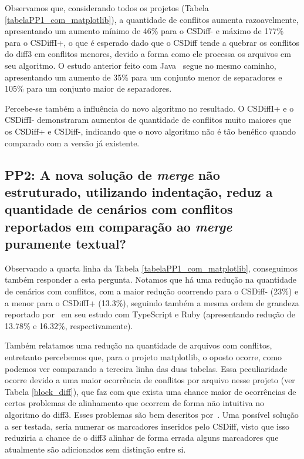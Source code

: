 Observamos que, considerando todos os projetos (Tabela \ref{tabelaPP1_com_matplotlib}), a quantidade de conflitos aumenta
razoavelmente, apresentando um aumento mínimo de 46\% para o CSDiff- e máximo de 177\% para o CSDiffI+, o que é esperado dado que o
CSDiff tende a quebrar os conflitos do diff3 em conflitos menores, devido a forma como ele processa os arquivos em seu algoritmo.
O estudo anterior feito com Java~\cite{clem21} segue no mesmo caminho, apresentando um aumento de 35\% para um conjunto menor de
separadores e 105\% para um conjunto maior de separadores.

Percebe-se também a influência do novo algoritmo no resultado. O CSDiffI+ e o CSDiffI- demonstraram aumentos de quantidade de
conflitos muito maiores que os CSDiff+ e CSDiff-, indicando que o novo algoritmo não é tão benéfico quando comparado com a
versão já existente.

\subsection{PP2: A nova solução de \emph{merge} não estruturado, utilizando indentação,
	reduz a quantidade de cenários com conflitos reportados em comparação ao \emph{merge} puramente textual?}
Observando a quarta linha da Tabela \ref{tabelaPP1_com_matplotlib}, conseguimos também responder a esta pergunta. Notamos
que há uma redução na quantidade de cenários com conflitos, com a maior redução ocorrendo para o CSDiff- (23\%) e a menor para o
CSDiffI+ (13.3\%), seguindo também a mesma ordem de grandeza reportado por~\citeauthor{heitor21} em seu estudo com TypeScript
e Ruby (apresentando redução de 13.78\% e 16.32\%, respectivamente).

Também relatamos uma redução na quantidade de arquivos com conflitos, entretanto percebemos que,
para o projeto matplotlib, o oposto ocorre, como podemos ver comparando a terceira linha das duas tabelas. Essa peculiaridade
ocorre devido a uma maior ocorrência de conflitos por arquivo nesse projeto (ver Tabela \ref{block_diff}), que faz com que
exista uma chance maior de ocorrências de certos problemas de alinhamento que ocorrem de forma não intuitiva no algoritmo do
diff3. Esses problemas são bem descritos por~\cite{khan07}. Uma possível solução a ser testada, seria numerar os marcadores
inseridos pelo CSDiff, visto que isso reduziria a chance de o diff3 alinhar de forma errada alguns marcadores que atualmente
são adicionados sem distinção entre si.


